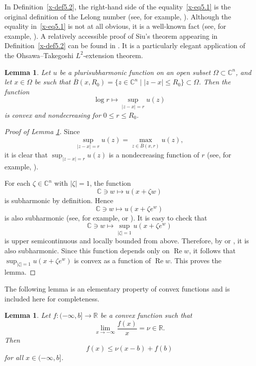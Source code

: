 \documentclass[12pt,twoside]{amsart}
\DeclareMathOperator{\re}{Re}
\newtheorem{lem}[thm]{Lemma}
\theoremstyle{definition}
\begin{document}
In Definition~\ref{x-def5.2}, the right-hand side of the equality~\eqref{x-eq5.1} 
is the original definition of the Lelong number (see, for example, 
\cite[Chapter~III, (5.7)]{demailly}).  
Although the equality in~\eqref{x-eq5.1} is not at all 
obvious, it is a well-known fact 
(see, for example, \cite[Chapter~III, (6.9), Example]{demailly}).  
A relatively accessible proof of Siu's theorem appearing in 
Definition~\ref{x-def5.2} can be found in 
\cite[13.A.~Approximation of Plurisubharmonic Functions 
via Bergman kernels]{demailly1}.  
It is a particularly elegant application of the Ohsawa--Takegoshi 
$L^2$-extension theorem.

\begin{lem}\label{x-lem5.3}
Let $u$ be a plurisubharmonic function on an open subset 
$\Omega \subset \mathbb C^n$, and let $x \in \Omega$ be such that $\overline B(x, R_0)=\{z\in \mathbb C^n\mid 
|z-x|\leq R_0\} \subset \Omega$. 
Then the function
\[
\log r \longmapsto \sup_{|z-x|=r} u(z)
\]
is convex and nondecreasing for $0 \le r \le R_0$. 
\end{lem}

\begin{proof}[Proof of Lemma \ref{x-lem5.3}]
Since 
\[
\sup_{|z-x|=r} u(z) = \max_{z\in \overline B(x, r)} u(z),
\]
it is clear that $\sup_{|z-x|=r} u(z)$ is a nondecreasing function of $r$ 
(see, for example, \cite[(3.3.2) Theorem and (3.3.27) Remark]{noguchi-ochiai}). 

For each $\zeta \in \mathbb C^n$ with $|\zeta| = 1$, the function 
\[
\mathbb C \ni w \longmapsto u(x + \zeta w)
\]
is subharmonic by definition. 
Hence 
\[
\mathbb C \ni w \longmapsto u(x + \zeta e^w)
\]
is also subharmonic (see, for example, \cite[(1.8) Proposition]{demailly1} or 
\cite[(3.3.19) Theorem and (3.3.38) Remark]{noguchi-ochiai}). 
It is easy to check that 
\[
\mathbb C \ni w \longmapsto \sup_{|\zeta|=1} u(x + \zeta e^w)
\]
is upper semicontinuous and locally bounded from above. 
Therefore, by \cite[(3.3.3) Lemma (ii)]{noguchi-ochiai} or 
\cite[Chapter~I, (5.7) Theorem]{demailly}, it is also subharmonic. 
Since this function depends only on $\re w$, it follows that 
$\sup_{|\zeta|=1} u(x + \zeta e^w)$ is convex as a function of $\re w$. 
This proves the lemma. 
\end{proof}

The following lemma is an elementary 
property of convex functions and is included here for completeness.

\begin{lem}\label{x-lem5.4}
Let $f\colon (-\infty, b]\to \mathbb R$ be a convex function such that 
\[
\lim_{x\to -\infty}\frac{f(x)}{x}=\nu \in \mathbb R. 
\] 
Then 
\[
f(x) \le \nu (x-b) + f(b)
\]
for all $x \in (-\infty, b]$. 
\end{lem}
\end{document}
